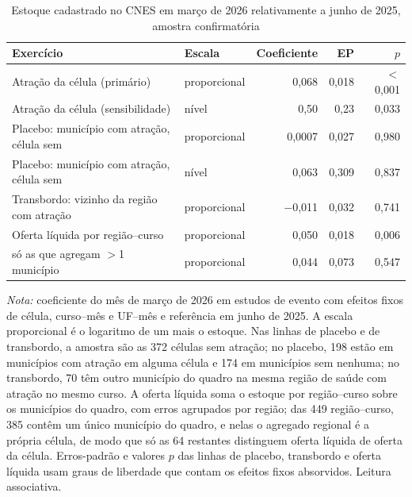 \documentclass[11pt,a4paper]{article}
\begin{document}
\begin{table}[htbp]
\centering
\small
\caption{Estoque cadastrado no CNES em março de 2026 relativamente a junho de 2025, amostra confirmatória}
\label{tab:a5}
\begin{tabular}{llrrr}
\toprule
Exercício & Escala & Coeficiente & EP & $p$ \\
\midrule
Atração da célula (primário) & proporcional & 0,068 & 0,018 & $<$0,001 \\
Atração da célula (sensibilidade) & nível & 0,50 & 0,23 & 0,033 \\
Placebo: município com atração, célula sem & proporcional & 0,0007 & 0,027 & 0,980 \\
Placebo: município com atração, célula sem & nível & 0,063 & 0,309 & 0,837 \\
Transbordo: vizinho da região com atração & proporcional & $-$0,011 & 0,032 & 0,741 \\
Oferta líquida por região--curso & proporcional & 0,050 & 0,018 & 0,006 \\
\quad só as que agregam $>$1 município & proporcional & 0,044 & 0,073 & 0,547 \\
\bottomrule
\end{tabular}

\vspace{2pt}
\begin{minipage}{0.92\textwidth}
\footnotesize \textit{Nota:} coeficiente do mês de março de 2026 em estudos de
evento com efeitos fixos de célula, curso--mês e UF--mês e referência em junho de
2025. A escala proporcional é o logaritmo de um mais o estoque. Nas linhas de
placebo e de transbordo, a amostra são as 372 células sem atração; no placebo, 198
estão em municípios com atração em alguma célula e 174 em municípios sem nenhuma;
no transbordo, 70 têm outro município do quadro na mesma região de saúde com
atração no mesmo curso. A oferta líquida soma o estoque por região--curso sobre
os municípios do quadro, com erros agrupados por região; das 449 região--curso,
385 contêm um único município do quadro, e nelas o agregado regional é a
própria célula, de modo que só as 64 restantes distinguem oferta líquida de
oferta da célula. Erros-padrão e valores
$p$ das linhas de placebo, transbordo e oferta líquida usam graus de liberdade
que contam os efeitos fixos absorvidos. Leitura associativa.
\end{minipage}
\end{table}
\end{document}
